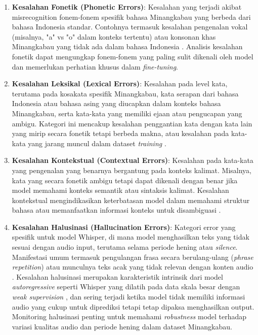 \begin{enumerate}[noitemsep]
    \item \textbf{Kesalahan Fonetik (Phonetic Errors)}: Kesalahan yang terjadi akibat misrecognition fonem-fonem spesifik bahasa Minangkabau yang berbeda dari bahasa Indonesia standar. Contohnya termasuk kesalahan pengenalan vokal (misalnya, "a" vs "o" dalam konteks tertentu) atau konsonan khas Minangkabau yang tidak ada dalam bahasa Indonesia \cite{koto2020minangkabau}. Analisis kesalahan fonetik dapat mengungkap fonem-fonem yang paling sulit dikenali oleh model dan memerlukan perhatian khusus dalam \textit{fine-tuning}.

    \item \textbf{Kesalahan Leksikal (Lexical Errors)}: Kesalahan pada level kata, terutama pada kosakata spesifik Minangkabau, kata serapan dari bahasa Indonesia atau bahasa asing yang diucapkan dalam konteks bahasa Minangkabau, serta kata-kata yang memiliki ejaan atau pengucapan yang ambigu. Kategori ini mencakup kesalahan penggantian kata dengan kata lain yang mirip secara fonetik tetapi berbeda makna, atau kesalahan pada kata-kata yang jarang muncul dalam dataset \textit{training} \cite{sovia2022minangkabau}.

    \item \textbf{Kesalahan Kontekstual (Contextual Errors)}: Kesalahan pada kata-kata yang pengenalan yang benarnya bergantung pada konteks kalimat. Misalnya, kata yang secara fonetik ambigu tetapi dapat dikenali dengan benar jika model memahami konteks semantik atau sintaksis kalimat. Kesalahan kontekstual mengindikasikan keterbatasan model dalam memahami struktur bahasa atau memanfaatkan informasi konteks untuk disambiguasi \cite{vaswani2017attention}.

    \item \textbf{Kesalahan Halusinasi (Hallucination Errors)}: Kategori error yang spesifik untuk model Whisper, di mana model menghasilkan teks yang tidak sesuai dengan audio input, terutama selama periode hening atau \textit{silence}. Manifestasi umum termasuk pengulangan frasa secara berulang-ulang (\textit{phrase repetition}) atau munculnya teks acak yang tidak relevan dengan konten audio \cite{gete2025whispering}. Kesalahan halusinasi merupakan karakteristik intrinsik dari model \textit{autoregressive} seperti Whisper yang dilatih pada data skala besar dengan \textit{weak supervision} \cite{radford2023whisper}, dan sering terjadi ketika model tidak memiliki informasi audio yang cukup untuk diprediksi tetapi tetap dipaksa menghasilkan output. Monitoring halusinasi penting untuk memahami \textit{robustness} model terhadap variasi kualitas audio dan periode hening dalam dataset Minangkabau.
\end{enumerate}

